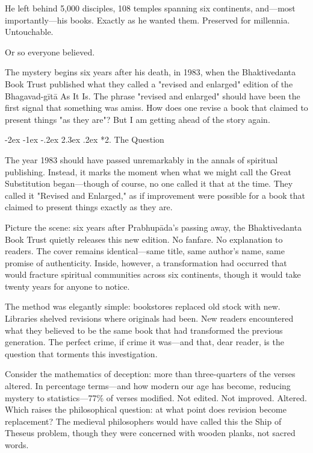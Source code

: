 \documentclass[12pt,twoside]{book}
\makeatletter
\def\cleardoublepage{\clearpage\if@twoside \ifodd\c@page\else\hbox{}\thispagestyle{empty}\newpage\if@twocolumn\hbox{}\newpage\fi\fi\fi}
\renewcommand\section{\@startsection{section}{1}{\z@}%
{-2ex \@plus -1ex \@minus -.2ex}%
{2.3ex \@plus.2ex}%
{\normalfont\Large\bfseries}}
\makeatother
\begin{document}
He left behind 5,000 disciples, 108 temples spanning six continents, and—most importantly—his books. Exactly as he wanted them. Preserved for millennia. Untouchable.

Or so everyone believed.

The mystery begins six years after his death, in 1983, when the Bhaktivedanta Book Trust published what they called a "revised and enlarged" edition of the Bhagavad-gītā As It Is. The phrase "revised and enlarged" should have been the first signal that something was amiss. How does one revise a book that claimed to present things "as they are"? But I am getting ahead of the story again.

\cleardoublepage
\vspace*{0.20\textheight}
\section*{2. The Question}
\thispagestyle{chapterpage}

\normalfont\justifying
The year 1983 should have passed unremarkably in the annals of spiritual publishing. Instead, it marks the moment when what we might call the Great Substitution began—though of course, no one called it that at the time. They called it "Revised and Enlarged," as if improvement were possible for a book that claimed to present things exactly as they are.

Picture the scene: six years after Prabhupāda's passing away, the Bhaktivedanta Book Trust quietly releases this new edition. No fanfare. No explanation to readers. The cover remains identical—same title, same author's name, same promise of authenticity. Inside, however, a transformation had occurred that would fracture spiritual communities across six continents, though it would take twenty years for anyone to notice.

The method was elegantly simple: bookstores replaced old stock with new. Libraries shelved revisions where originals had been. New readers encountered what they believed to be the same book that had transformed the previous generation. The perfect crime, if crime it was—and that, dear reader, is the question that torments this investigation.

Consider the mathematics of deception: more than three-quarters of the verses altered. In percentage terms—and how modern our age has become, reducing mystery to statistics—77\% of verses modified. Not edited. Not improved. Altered. Which raises the philosophical question: at what point does revision become replacement? The medieval philosophers would have called this the Ship of Theseus problem, though they were concerned with wooden planks, not sacred words.
\end{document}
